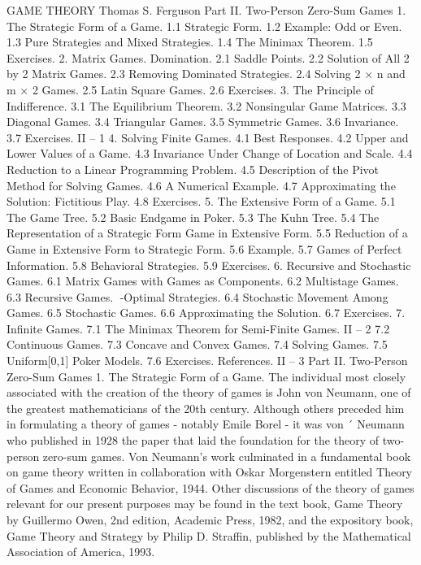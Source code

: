 GAME THEORY
Thomas S. Ferguson
Part II. Two-Person Zero-Sum Games
1. The Strategic Form of a Game.
1.1 Strategic Form.
1.2 Example: Odd or Even.
1.3 Pure Strategies and Mixed Strategies.
1.4 The Minimax Theorem.
1.5 Exercises.
2. Matrix Games. Domination.
2.1 Saddle Points.
2.2 Solution of All 2 by 2 Matrix Games.
2.3 Removing Dominated Strategies.
2.4 Solving 2 × n and m × 2 Games.
2.5 Latin Square Games.
2.6 Exercises.
3. The Principle of Indifference.
3.1 The Equilibrium Theorem.
3.2 Nonsingular Game Matrices.
3.3 Diagonal Games.
3.4 Triangular Games.
3.5 Symmetric Games.
3.6 Invariance.
3.7 Exercises.
II – 1
4. Solving Finite Games.
4.1 Best Responses.
4.2 Upper and Lower Values of a Game.
4.3 Invariance Under Change of Location and Scale.
4.4 Reduction to a Linear Programming Problem.
4.5 Description of the Pivot Method for Solving Games.
4.6 A Numerical Example.
4.7 Approximating the Solution: Fictitious Play.
4.8 Exercises.
5. The Extensive Form of a Game.
5.1 The Game Tree.
5.2 Basic Endgame in Poker.
5.3 The Kuhn Tree.
5.4 The Representation of a Strategic Form Game in Extensive Form.
5.5 Reduction of a Game in Extensive Form to Strategic Form.
5.6 Example.
5.7 Games of Perfect Information.
5.8 Behavioral Strategies.
5.9 Exercises.
6. Recursive and Stochastic Games.
6.1 Matrix Games with Games as Components.
6.2 Multistage Games.
6.3 Recursive Games. -Optimal Strategies.
6.4 Stochastic Movement Among Games.
6.5 Stochastic Games.
6.6 Approximating the Solution.
6.7 Exercises.
7. Infinite Games.
7.1 The Minimax Theorem for Semi-Finite Games.
II – 2
7.2 Continuous Games.
7.3 Concave and Convex Games.
7.4 Solving Games.
7.5 Uniform[0,1] Poker Models.
7.6 Exercises.
References.
II – 3
Part II. Two-Person Zero-Sum Games
1. The Strategic Form of a Game.
The individual most closely associated with the creation of the theory of games is
John von Neumann, one of the greatest mathematicians of the 20th century. Although
others preceded him in formulating a theory of games - notably Emile Borel - it was von ´
Neumann who published in 1928 the paper that laid the foundation for the theory of
two-person zero-sum games. Von Neumann’s work culminated in a fundamental book on
game theory written in collaboration with Oskar Morgenstern entitled Theory of Games
and Economic Behavior, 1944. Other discussions of the theory of games relevant for our
present purposes may be found in the text book, Game Theory by Guillermo Owen, 2nd
edition, Academic Press, 1982, and the expository book, Game Theory and Strategy by
Philip D. Straffin, published by the Mathematical Association of America, 1993.
